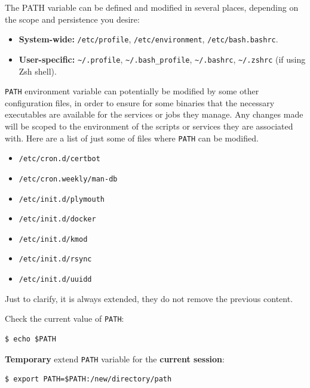 \documentclass{article}
\newenvironment{blocktemplateIII}[1]{%
    \tcolorbox[beamer,%
    noparskip,breakable,
    ,colframe=Red,%
    colbacklower=LimeGreen!75!LightGreen,%
    title=#1]}%
    {\endtcolorbox}
\newenvironment{codetemplate}[1][]{%
  \mybasecolorbox[#1]
  \itshape
}{%
  \endmybasecolorbox
}
\begin{document}
The PATH variable can be defined and modified in several places, depending on the scope and persistence you desire:

\begin{itemize}
    \item \textbf{System-wide:} \verb|/etc/profile|, \verb|/etc/environment|, \verb|/etc/bash.bashrc|.
    \item \textbf{User-specific:} \verb|~/.profile|, \verb|~/.bash_profile|, \verb|~/.bashrc|, \verb|~/.zshrc| (if using Zsh shell).
\end{itemize}

\begin{blocktemplateIII}{Warning}
\verb|PATH| environment variable can potentially be modified by some other configuration files, in order to ensure for some binaries that the necessary executables are available for the services or jobs they manage. Any changes made will be scoped to the environment of the scripts or services they are associated with. Here are a list of just some of files where \verb|PATH| can be modified. 
\begin{itemize}
    \item \verb|/etc/cron.d/certbot|
    \item \verb|/etc/cron.weekly/man-db|
    \item \verb|/etc/init.d/plymouth|
    \item \verb|/etc/init.d/docker|
    \item \verb|/etc/init.d/kmod|
    \item \verb|/etc/init.d/rsync|
    \item \verb|/etc/init.d/uuidd|
\end{itemize}
Just to clarify, it is always extended, they do not remove the previous content.
\end{blocktemplateIII}

Check the current value of \verb|PATH|:
\begin{codetemplate}{}
\begin{verbatim}
$ echo $PATH
\end{verbatim}
\end{codetemplate}

\textbf{Temporary} extend \verb|PATH| variable for the \textbf{current session}:
\begin{codetemplate}{}
\begin{verbatim}
$ export PATH=$PATH:/new/directory/path
\end{verbatim}
\end{codetemplate}
\end{document}
